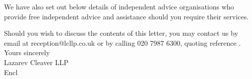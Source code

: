 \documentclass{article}
\begin{document}
\noindent We have also set out below details of independent advice organisations who provide free
independent advice and assistance should you require their services.\\\vspace{1 mm}

\noindent Should you wish to discuss the contents of this letter, you may contact us by email at
reception@lcllp.co.uk or by calling 020 7987 6300, quoting reference \caseno.\\\vspace{3 mm}
Yours sincerely\\\vspace{3 mm}
Lazarev Cleaver LLP\\\vspace{3 mm}
Encl
\end{document}
